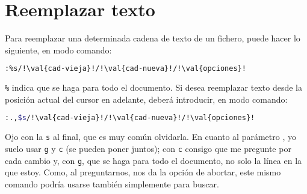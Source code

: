 \section{Reemplazar texto}\label{sec:vim-reempl}
Para reemplazar una determinada cadena de texto  de un fichero, puede hacer lo siguiente, en modo
comando:

\begin{lstlisting}[gobble=2,language=bash,style=bashinteract,escapechar=!]
  :%s/!\val{cad-vieja}!/!\val{cad-nueva}!/!\val{opciones}!
\end{lstlisting}

\noindent \lstinline+%+ indica que se haga para todo el documento. Si desea reemplazar texto desde la posición
actual del cursor en adelante, deberá introducir, en modo comando:

\begin{lstlisting}[gobble=2,language=bash,style=bashinteract,escapechar=!]
  :.,$s/!\val{cad-vieja}!/!\val{cad-nueva}!/!\val{opciones}!
\end{lstlisting}

\noindent Ojo con la \lstinline+s+ al final, que es muy común olvidarla. En cuanto al parámetro ,
yo suelo usar \lstinline+g+ y \lstinline+c+ (se pueden poner juntos); con \lstinline+c+ consigo que me pregunte
por cada cambio y, con \lstinline+g+, que se haga para todo el documento, no solo la línea en la que estoy.
Como, al preguntarnos, nos da la opción de abortar, este mismo comando podría usarse también simplemente para
buscar.

